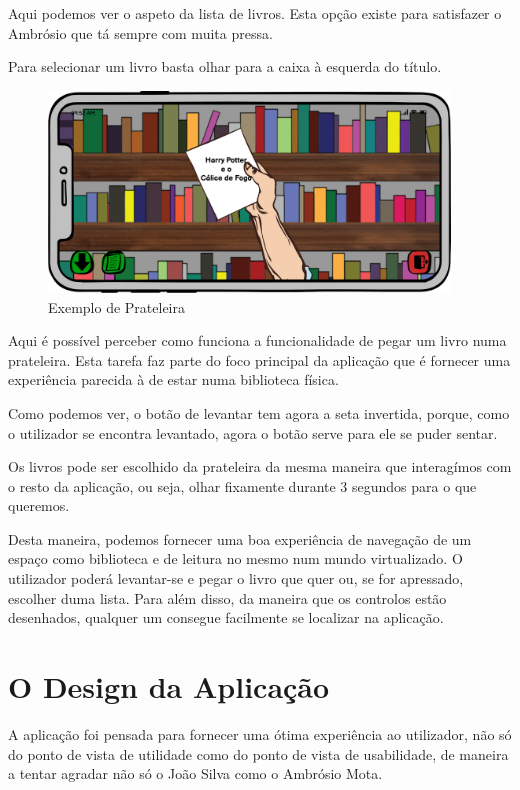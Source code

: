 \documentclass[11pt]{article}
\begin{document}
	Aqui podemos ver o aspeto da lista de livros. Esta opção existe para satisfazer o Ambrósio que tá sempre com muita pressa.
	
	Para selecionar um livro basta olhar para a caixa à esquerda do título.
	
	\begin{figure}[H]
		\includegraphics[width=0.95\textwidth,height=0.25\textheight,keepaspectratio]{biblio-escolher-prateleira}
		\centering
		\caption{Exemplo de Prateleira}
		\label{fig:prateleira}
	\end{figure}

	Aqui é possível perceber como funciona a funcionalidade de pegar um livro numa prateleira. Esta tarefa faz parte do foco principal da aplicação que é fornecer uma experiência parecida à de estar numa biblioteca física.
	
	Como podemos ver, o botão de levantar tem agora a seta invertida, porque, como o utilizador se encontra levantado, agora o botão serve para ele se puder sentar.
	
	Os livros pode ser escolhido da prateleira da mesma maneira que interagímos com o resto da aplicação, ou seja, olhar fixamente durante 3 segundos para o que queremos.
	
	Desta maneira, podemos fornecer uma boa experiência de navegação de um espaço como biblioteca e de leitura no mesmo num mundo virtualizado. O utilizador poderá levantar-se e pegar o livro que quer ou, se for apressado, escolher duma lista. Para além disso, da maneira que os controlos estão desenhados, qualquer um consegue facilmente se localizar na aplicação. 
	
	\large
	\section{O Design da Aplicação}
	\normalsize
	
	A aplicação foi pensada para fornecer uma ótima experiência ao utilizador, não só do ponto de vista de utilidade como do ponto de vista de usabilidade, de maneira a tentar agradar não só o João Silva como o Ambrósio Mota.
	
\end{document}
